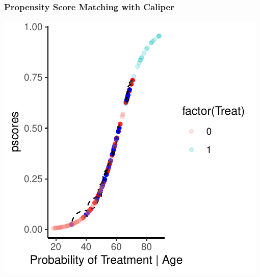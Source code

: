 \documentclass[xcolor=x11names,compress]{beamer}\usepackage[]{graphicx}\usepackage[]{color}
\makeatletter
\def\maxwidth{ %
  \ifdim\Gin@nat@width>\linewidth
    \linewidth
  \else
    \Gin@nat@width
  \fi
}
\newenvironment{knitrout}{}{} %
\renewcommand{\(}{\begin{columns}}
\renewcommand{\)}{\end{columns}}
\newcommand{\<}[1]{\begin{column}{#1}}
\renewcommand{\>}{\end{column}}
\makeatother
\begin{document}
\begin{frame}
\frametitle{Propensity Score Matching with Caliper}
\begin{center}
\begin{knitrout}
\color{fgcolor}
\includegraphics[width=\maxwidth]{figure/pscore_matching_caliper_2-1} 

\end{knitrout}
\end{center}
\end{frame}
\end{document}
